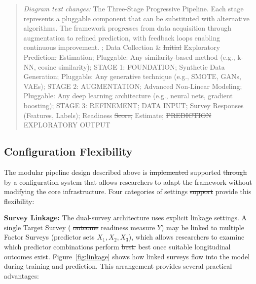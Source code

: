 \documentclass[letterpaper,11pt]{article}
\newcommand{\DIFdel}[1]{%
  \begingroup\setlength{\fboxsep}{0.5pt}%
  \colorbox{diffdelbg}{\textcolor{diffdeltext}{\sout{#1}}}%
  \endgroup}
\newcommand{\DIFadd}[1]{%
  \begingroup\setlength{\fboxsep}{0.5pt}%
  \colorbox{diffaddbg}{\textcolor{diffaddtext}{#1}}%
  \endgroup}
\begin{document}
\begin{quote}\footnotesize
\textit{Diagram text changes:} \DIFadd{The} \DIFadd{Three-Stage} \DIFadd{Progressive} \DIFadd{Pipeline.} \DIFadd{Each} \DIFadd{stage} \DIFadd{represents} \DIFadd{a} \DIFadd{pluggable} \DIFadd{component} \DIFadd{that} \DIFadd{can} \DIFadd{be} \DIFadd{substituted} \DIFadd{with} \DIFadd{alternative} \DIFadd{algorithms.} \DIFadd{The} \DIFadd{framework} \DIFadd{progresses} \DIFadd{from} \DIFadd{data} \DIFadd{acquisition} \DIFadd{through} \DIFadd{augmentation} \DIFadd{to} \DIFadd{refined} \DIFadd{prediction,} \DIFadd{with} \DIFadd{feedback} \DIFadd{loops} \DIFadd{enabling} \DIFadd{continuous} \DIFadd{improvement.}; Data Collection \& \DIFdel{Initial} \DIFadd{Exploratory} \DIFdel{Prediction;} \DIFadd{Estimation;} Pluggable: Any similarity-based method (e.g., k-NN, cosine similarity); STAGE 1: FOUNDATION; Synthetic Data Generation; Pluggable: Any generative technique (e.g., SMOTE, GANs, VAEs); STAGE 2: AUGMENTATION; Advanced Non-Linear Modeling; Pluggable: Any deep learning architecture (e.g., neural nets, gradient boosting); STAGE 3: REFINEMENT; DATA INPUT; Survey Responses (Features, Labels); Readiness \DIFdel{Score;} \DIFadd{Estimate;} \DIFdel{PREDICTION} \DIFadd{EXPLORATORY} OUTPUT
\end{quote}

\subsection{Configuration Flexibility}\label{subsec:config}

The modular pipeline design described above is \DIFdel{implemented} \DIFadd{supported} \DIFdel{through} \DIFadd{by} a configuration system that allows researchers to adapt the framework without modifying the core infrastructure. Four categories of settings \DIFdel{support} \DIFadd{provide} this flexibility:

\textbf{Survey Linkage:} The dual-survey architecture uses explicit linkage settings. A single Target Survey (\DIFdel{outcome} \DIFadd{readiness} \DIFadd{measure} $Y$) may be linked to multiple Factor Surveys (predictor sets $X_1, X_2, X_3$), which allows researchers to examine which predictor combinations perform \DIFdel{best.} \DIFadd{best} \DIFadd{once} \DIFadd{suitable} \DIFadd{longitudinal} \DIFadd{outcomes} \DIFadd{exist.} Figure~\ref{fig:linkage} shows how linked surveys flow into the model during training and prediction. This arrangement provides several practical advantages:
\end{document}

